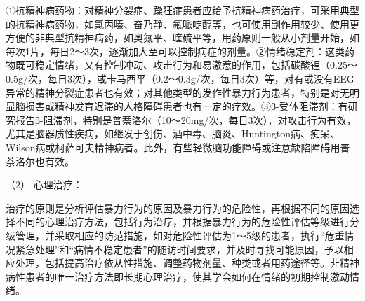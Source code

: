 ①抗精神病药物：对精神分裂症、躁狂症患者应给予抗精神病药治疗，可采用典型的抗精神病药物，如氯丙嗪、奋乃静、氟哌啶醇等，也可使用副作用较少、使用更方便的非典型抗精神病药，如奥氮平、喹硫平等，用药原则一般从小剂量开始，如每次1片，每日2～3次，逐渐加大至可以控制病症的剂量。②情绪稳定剂：这类药物既可稳定情绪，又有控制冲动、攻击行为和易激惹的作用，包括碳酸锂（0.25～0.5g/次，每日3次），或卡马西平（0.2～0.3g/次，每日3次）等，对有或没有EEG异常的精神分裂症患者也有效；对其他类型的发作性暴力行为患者，特别是对无明显脑损害或精神发育迟滞的人格障碍患者也有一定的疗效。③β-受体阻滞剂：有研究报告β-阻滞剂，特别是普萘洛尔（10～20mg/次，每日3次），对攻击行为有效，尤其是脑器质性疾病，如继发于创伤、酒中毒、脑炎、Huntington病、痴呆、Wilson病或柯萨可夫精神病者。此外，有些轻微脑功能障碍或注意缺陷障碍用普萘洛尔也有效。

\hypertarget{text00054.htmlux5cux23CHP1-18-12-3-6-2}{}
（2） 心理治疗：

治疗的原则是分析评估暴力行为的原因及暴力行为的危险性，再根据不同的原因选择不同的心理治疗方法，包括行为治疗，并根据暴力行为的危险性评估等级进行分级管理，并采取相应的防范措施，如对危险性评估为1～5级的患者，执行“危重情况紧急处理”和“病情不稳定患者”的随访时间要求，并及时寻找可能原因，予以相应处理，包括提高治疗依从性措施、调整药物剂量、种类或者用药途径等。非精神病性患者的唯一治疗方法即长期心理治疗，使其学会如何在情绪的初期控制激动情绪。

\protect\hypertarget{text00055.html}{}{}


